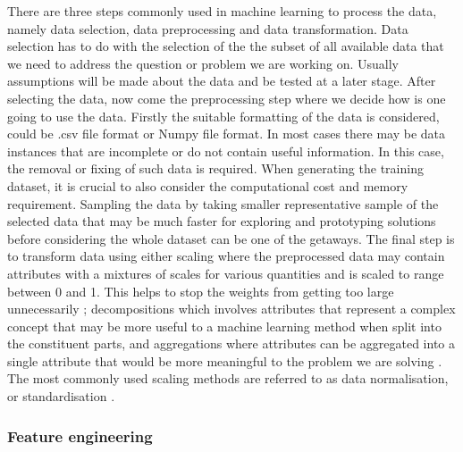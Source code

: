 There are three steps commonly used in machine learning to process the data, namely data selection, data preprocessing  and data transformation. Data selection has to do with the selection of the the subset of all available data that we need to address the question or problem we are working on. Usually assumptions will be made  about the data and be tested at a later stage. After selecting the data, now come the preprocessing step where we decide how is one going to use the data. Firstly the suitable formatting of the data is considered, could be .csv file format or Numpy file format. In most cases there may be data instances that are incomplete or do not contain useful information. In this case, the removal or fixing of such data is required. When generating the training dataset, it is crucial to also consider the computational cost and memory requirement. Sampling the data by taking smaller representative sample of the selected data that may be much faster for exploring and prototyping solutions before considering the whole dataset can be one of the getaways. The final step is to transform data using either scaling where the preprocessed data may contain attributes with a mixtures of scales for various quantities and is scaled to range between 0 and 1. This helps to stop the weights from getting too large unnecessarily \citep{marsland2015machine}; decompositions which involves attributes that represent a complex concept that may be more useful to a machine learning method when split into the constituent parts, and  aggregations where attributes can be aggregated into a single attribute that would be more meaningful to the problem we are solving \citep{brownlee2013prepare}. The most commonly used scaling methods are referred to as data normalisation, or standardisation \citep{marsland2015machine}.
    
\subsubsection{Feature engineering}

